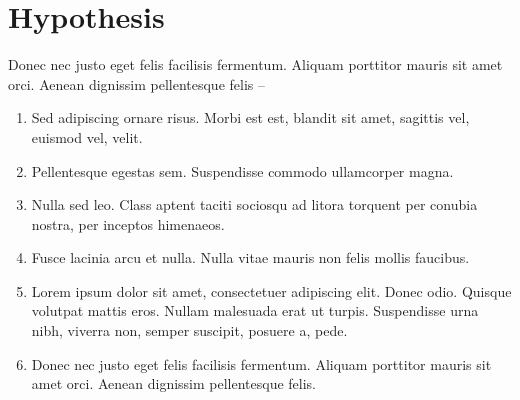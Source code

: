 \section{Hypothesis}

Donec nec justo eget felis facilisis fermentum. Aliquam porttitor mauris sit amet orci. Aenean dignissim pellentesque felis --

\begin{enumerate}
    \item Sed adipiscing ornare risus. Morbi est est, blandit sit amet, sagittis vel, euismod vel, velit.     \item Pellentesque egestas sem. Suspendisse commodo ullamcorper magna.
    \item Nulla sed leo. Class aptent taciti sociosqu ad litora torquent per conubia nostra, per inceptos himenaeos.
    \item Fusce lacinia arcu et nulla. Nulla vitae mauris non felis mollis faucibus.
    \item Lorem ipsum dolor sit amet, consectetuer adipiscing elit. Donec odio. Quisque volutpat mattis eros. Nullam malesuada erat ut turpis. Suspendisse urna nibh, viverra non, semper suscipit, posuere a, pede.
    \item Donec nec justo eget felis facilisis fermentum. Aliquam porttitor mauris sit amet orci. Aenean dignissim pellentesque felis.
\end{enumerate}